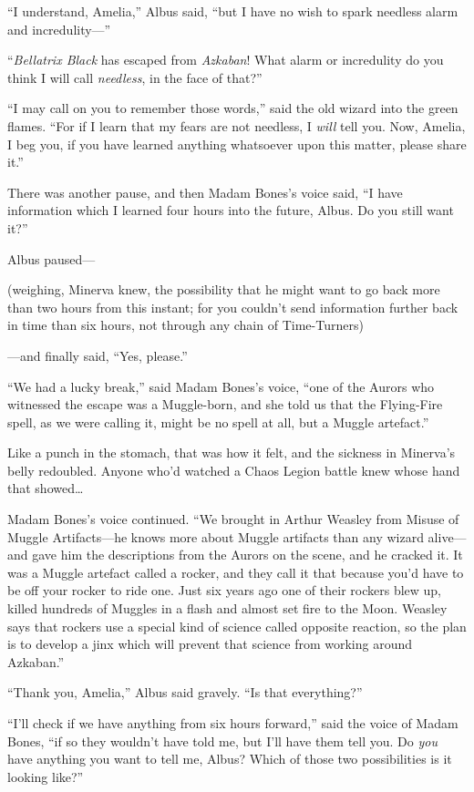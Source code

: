 “I understand, Amelia,” Albus said, “but I have no wish to spark needless alarm and incredulity—”

“\emph{Bellatrix Black} has escaped from \emph{Azkaban}! What alarm or incredulity do you think I will call \emph{needless}, in the face of that?”

“I may call on you to remember those words,” said the old wizard into the green flames. “For if I learn that my fears are not needless, I \emph{will} tell you. Now, Amelia, I beg you, if you have learned anything whatsoever upon this matter, please share it.”

There was another pause, and then Madam Bones’s voice said, “I have information which I learned four hours into the future, Albus. Do you still want it?”

Albus paused—

(weighing, Minerva knew, the possibility that he might want to go back more than two hours from this instant; for you couldn’t send information further back in time than six hours, not through any chain of Time-Turners)

—and finally said, “Yes, please.”

“We had a lucky break,” said Madam Bones’s voice, “one of the Aurors who witnessed the escape was a Muggle-born, and she told us that the Flying-Fire spell, as we were calling it, might be no spell at all, but a Muggle artefact.”

Like a punch in the stomach, that was how it felt, and the sickness in Minerva’s belly redoubled. Anyone who’d watched a Chaos Legion battle knew whose hand that showed…

Madam Bones’s voice continued. “We brought in Arthur Weasley from Misuse of Muggle Artifacts—he knows more about Muggle artifacts than any wizard alive—and gave him the descriptions from the Aurors on the scene, and he cracked it. It was a Muggle artefact called a rocker, and they call it that because you’d have to be off your rocker to ride one. Just six years ago one of their rockers blew up, killed hundreds of Muggles in a flash and almost set fire to the Moon. Weasley says that rockers use a special kind of science called opposite reaction, so the plan is to develop a jinx which will prevent that science from working around Azkaban.”

“Thank you, Amelia,” Albus said gravely. “Is that everything?”

“I’ll check if we have anything from six hours forward,” said the voice of Madam Bones, “if so they wouldn’t have told me, but I’ll have them tell you. Do \emph{you} have anything you want to tell me, Albus? Which of those two possibilities is it looking like?”

